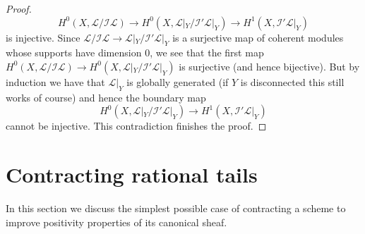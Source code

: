 \begin{proof}
$$
H^0(X, \mathcal{L}/\mathcal{I}\mathcal{L}) \to
H^0(X, \mathcal{L}|_Y/\mathcal{I}'\mathcal{L}|_Y) \to
H^1(X, \mathcal{I}'\mathcal{L}|_Y)
$$
is injective. Since
$\mathcal{L}/\mathcal{I}\mathcal{L} \to
\mathcal{L}|_Y/\mathcal{I}'\mathcal{L}|_Y$
is a surjective map of coherent modules whose supports have
dimension $0$, we see that the first map
$H^0(X, \mathcal{L}/\mathcal{I}\mathcal{L}) \to
H^0(X, \mathcal{L}|_Y/\mathcal{I}'\mathcal{L}|_Y)$
is surjective (and hence bijective).
But by induction we have that $\mathcal{L}|_Y$ is globally
generated (if $Y$ is disconnected this still works of course)
and hence the boundary map
$$
H^0(X, \mathcal{L}|_Y/\mathcal{I}'\mathcal{L}|_Y) \to
H^1(X, \mathcal{I}'\mathcal{L}|_Y)
$$
cannot be injective.
This contradiction finishes the proof.
\end{proof}

\section{Contracting rational tails}
\label{curves-section-contracting-rational-tails}
In this section we discuss the simplest possible case of contracting
a scheme to improve positivity properties of its canonical sheaf.

